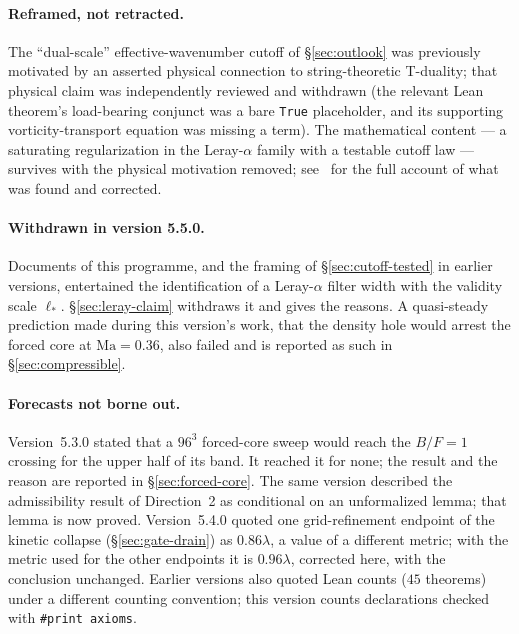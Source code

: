 \documentclass[11pt,a4paper]{article}
\begin{document}
\paragraph{Reframed, not retracted.} The ``dual-scale'' effective-wavenumber cutoff of
\S\ref{sec:outlook} was previously motivated by an asserted physical connection to string-theoretic
T-duality; that physical claim was independently reviewed and withdrawn (the relevant Lean theorem's
load-bearing conjunct was a bare \texttt{True} placeholder, and its supporting vorticity-transport
equation was missing a term). The mathematical content --- a saturating regularization in the
Leray-$\alpha$ family with a testable cutoff law --- survives with the physical motivation removed;
see~\cite{Callens2026v2} for the full account of what was found and corrected.

\paragraph{Withdrawn in version 5.5.0.} Documents of this programme, and the framing of
\S\ref{sec:cutoff-tested} in earlier versions, entertained the identification of a Leray-$\alpha$ filter
width with the validity scale $\ell_*$. \S\ref{sec:leray-claim} withdraws it and gives the reasons. A
quasi-steady prediction made during this version's work, that the density hole would arrest the forced
core at $\mathrm{Ma}=0.36$, also failed and is reported as such in \S\ref{sec:compressible}.

\paragraph{Forecasts not borne out.} Version~5.3.0 stated that a $96^3$ forced-core sweep would
reach the $B/F=1$ crossing for the upper half of its band. It reached it for none; the result and the
reason are reported in \S\ref{sec:forced-core}. The same version described the admissibility result
of Direction~2 as conditional on an unformalized lemma; that lemma is now proved.
Version~5.4.0 quoted one grid-refinement endpoint of the kinetic collapse (\S\ref{sec:gate-drain}) as
$0.86\lambda$, a value of a different metric; with the metric used for the other endpoints it is
$0.96\lambda$, corrected here, with the conclusion unchanged. Earlier versions also quoted Lean
counts ($45$ theorems) under a different counting convention; this version counts declarations
checked with \texttt{\#print axioms}.

\end{document}

